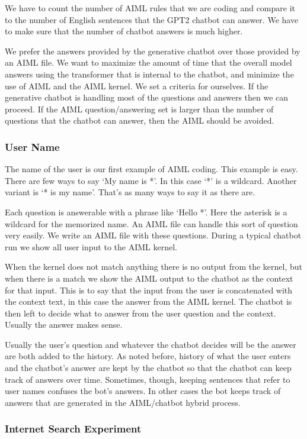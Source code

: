 We have to count the number of AIML rules that we are coding and compare it to the number of English sentences that the GPT2 chatbot can answer. We have to make sure that the number of chatbot answers is much higher.

We prefer the answers provided by the generative chatbot over those provided by an AIML file. We want to maximize the amount of time that the overall model answers using the transformer that is internal to the chatbot, and minimize the use of AIML and the AIML kernel. We set a criteria for ourselves. If the generative chatbot is handling most of the questions and answers then we can proceed. If the AIML question/answering set is larger than the number of questions that the chatbot can answer, then the AIML should be avoided. 

\subsubsection{User Name}
The name of the user is our first example of AIML coding. This example is easy. There are few ways to say `My name is *'. In this case `*' is a wildcard. Another variant is `* is my name'. That's as many ways to say it as there are.

Each question is answerable with a phrase like `Hello *'. Here the asterisk is a wildcard for the memorized name. An AIML file can handle this sort of question very easily. We write an AIML file with these questions. During a typical chatbot run we show all user input to the AIML kernel. 

When the kernel does not match anything there is no output from the kernel, but when there is a match we show the AIML output to the chatbot as the context for that input. This is to say that the input from the user is concatenated with the context text, in this case the answer from the AIML kernel. The chatbot is then left to decide what to answer from the user question and the context. Usually the answer makes sense.

Usually the user's question and whatever the chatbot decides will be the answer are both added to the history. As noted before, history of what the user enters and the chatbot's answer are kept by the chatbot so that the chatbot can keep track of answers over time. Sometimes, though, keeping sentences that refer to user names confuses the bot's answers. In other cases the bot keeps track of answers that are generated in the AIML/chatbot hybrid process.

\subsubsection{Internet Search Experiment}

